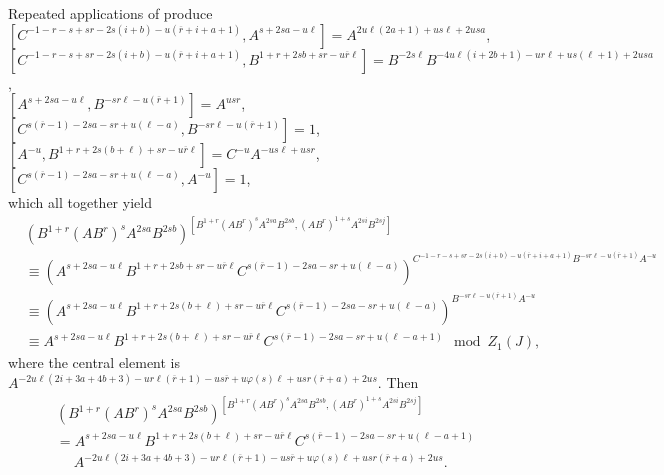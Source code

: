 \documentclass{amsart}
\theoremstyle{definition}
\theoremstyle{remark}
\begin{document}
Repeated applications of \cite[Theorem 3.1]{MS3} produce\\
$[C^{-1 - r - s + sr - 2s(i + b) - u(\overline{r} + i + a + 1)},A^{s + 2sa - u\ell}] = A^{2u\ell(2a + 1) + us\ell + 2usa}$,\\
$[C^{-1 - r - s + sr - 2s(i + b) - u(\overline{r} + i + a + 1)},B^{1 + r + 2sb + sr - u\overline{r}\ell}] = B^{-2s\ell} B^{-4u\ell(i + 2b + 1) - ur\ell + us(\ell + 1) + 2usa}$,\\
$[A^{s + 2sa - u\ell},B^{-sr\ell - u(\overline{r} + 1)}] = A^{usr}$,\\
$[C^{s(\overline{r} - 1) - 2sa - sr + u(\ell - a)},B^{-sr\ell - u(\overline{r} + 1)}] = 1$,\\
$[A^{-u},B^{1 + r + 2s(b + \ell) + sr - u\overline{r}\ell}] = C^{-u} A^{-us\ell + usr}$,\\
$[C^{s(\overline{r} - 1) - 2sa - sr + u(\ell - a)},A^{-u}] = 1$,\\
which all together yield
\begin{align*}
    &(B^{1+r} (AB^r)^s A^{2sa} B^{2sb})^{[B^{1+r} (AB^r)^s A^{2sa} B^{2sb},(AB^r)^{1+s} A^{2si} B^{2sj}]}\\
    &\equiv (A^{s + 2sa - u\ell} B^{1 + r + 2sb + sr - u\overline{r}\ell} C^{s(\overline{r} - 1) - 2sa - sr + u(\ell - a)})^{C^{-1 - r - s + sr - 2s(i + b) - u(\overline{r} + i + a + 1)} B^{-sr\ell - u(\overline{r} + 1)} A^{-u}}\\
    &\equiv (A^{s + 2sa - u\ell} B^{1 + r + 2s(b + \ell) + sr - u\overline{r}\ell} C^{s(\overline{r} - 1) - 2sa - sr + u(\ell - a)})^{B^{-sr\ell - u(\overline{r} + 1)} A^{-u}}\\
    &\equiv A^{s + 2sa - u\ell} B^{1 + r + 2s(b + \ell) + sr - u\overline{r}\ell} C^{s(\overline{r} - 1) - 2sa - sr + u(\ell - a + 1)}\mod Z_1(J),
\end{align*}
where the central element is $A^{-2u\ell(2i + 3a + 4b + 3) - ur\ell(\overline{r} + 1) - us\overline{r} + u\varphi(s)\ell + usr(\overline{r} + a) + 2us}$. Then
\begin{equation}\label{eq.L.2}
    \begin{split}
        &(B^{1+r} (AB^r)^s A^{2sa} B^{2sb})^{[B^{1+r} (AB^r)^s A^{2sa} B^{2sb},(AB^r)^{1+s} A^{2si} B^{2sj}]}\\
        &= A^{s + 2sa - u\ell} B^{1 + r + 2s(b + \ell) + sr - u\overline{r}\ell} C^{s(\overline{r} - 1) - 2sa - sr + u(\ell - a + 1)}\\
        &\quad\; A^{-2u\ell(2i + 3a + 4b + 3) - ur\ell(\overline{r} + 1) - us\overline{r} + u\varphi(s)\ell + usr(\overline{r} + a) + 2us}.
    \end{split}
\end{equation}
\end{document}
